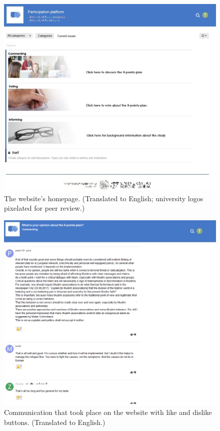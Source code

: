 \documentclass[
  english,
  man,floatsintext]{apa6}
\begin{document}
\begin{figure}

{\centering \includegraphics[width=.9\textwidth]{../figures/website/website_translated} 

}

\caption{The website's homepage. (Translated to English; university logos pixelated for peer review.)}\label{fig:website}
\end{figure}

\begin{figure}

{\centering \includegraphics[width=.9\textwidth]{../figures/website/comments_translated} 

}

\caption{Communication that took place on the website with like and dislike buttons. (Translated to English.)}\label{fig:comments}
\end{figure}
\end{document}
